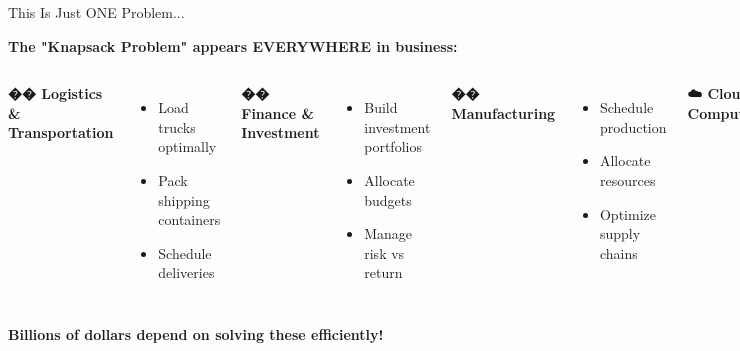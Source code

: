 \documentclass[aspectratio=169]{beamer}
\begin{document}
\begin{frame}{This Is Just ONE Problem...}
\begin{center}
\textbf{The "Knapsack Problem" appears EVERYWHERE in business:}
\end{center}

\vspace{0.5cm}

\begin{columns}
\textbf{�� Logistics \& Transportation}
\begin{itemize}
    \item Load trucks optimally
    \item Pack shipping containers
    \item Schedule deliveries
\end{itemize}

\vspace{0.3cm}
\textbf{�� Finance \& Investment}
\begin{itemize}
    \item Build investment portfolios
    \item Allocate budgets
    \item Manage risk vs return
\end{itemize}

\textbf{�� Manufacturing}
\begin{itemize}
    \item Schedule production
    \item Allocate resources
    \item Optimize supply chains
\end{itemize}

\vspace{0.3cm}
\textbf{☁️ Cloud Computing}
\begin{itemize}
    \item Allocate servers
    \item Balance workloads
    \item Minimize costs
\end{itemize}
\end{columns}

\vspace{0.5cm}
\begin{center}
\large \textcolor{aiblue}{\textbf{Billions of dollars depend on solving these efficiently!}}
\end{center}
\end{frame}
\end{document}
